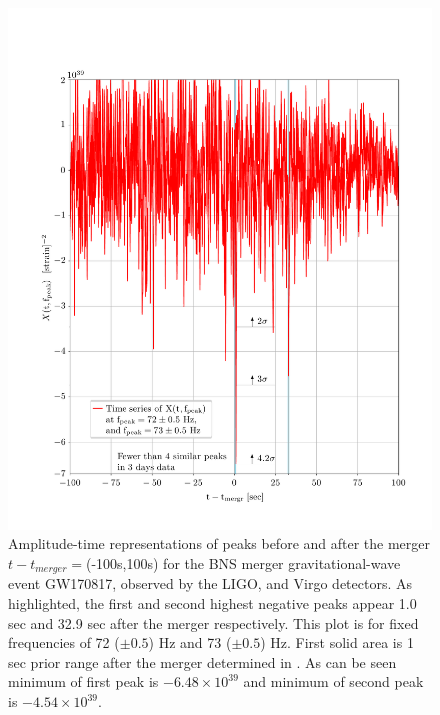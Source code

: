 \documentclass[12pt]{article}
\begin{document}
\begin{figure}[!tbp]
    \includegraphics[width=1\textwidth]{peaks_in_time.pdf}
 \caption{Amplitude-time representations of peaks before and after the merger $t-t_{merger}=$(-100s,100s) for the BNS merger gravitational-wave event GW170817, observed by the LIGO, and Virgo detectors. As highlighted, the first and second highest negative peaks appear 1.0 sec and 32.9 sec after the merger respectively.  This plot is for fixed frequencies of 72 ($\pm0.5$) Hz and 73 ($\pm0.5$) Hz. First solid area is 1 sec prior range after the merger determined in \cite{Abbott:2017dke}. As can be seen minimum of first peak is $-6.48\times10^{39}$ and minimum of second peak is $-4.54 \times 10^{39}$.}
 \label{NS-NS_2}
\end{figure}
\end{document}
